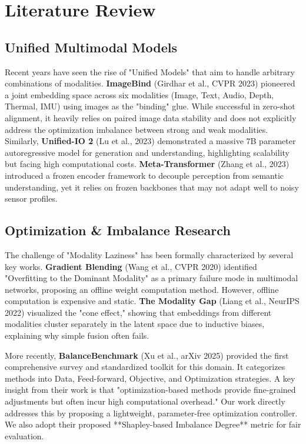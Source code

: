\documentclass[11pt, a4paper]{article}
\begin{document}
\section{Literature Review}
\subsection{Unified Multimodal Models}
Recent years have seen the rise of "Unified Models" that aim to handle arbitrary combinations of modalities. \textbf{ImageBind} (Girdhar et al., CVPR 2023) pioneered a joint embedding space across six modalities (Image, Text, Audio, Depth, Thermal, IMU) using images as the "binding" glue. While successful in zero-shot alignment, it heavily relies on paired image data stability and does not explicitly address the optimization imbalance between strong and weak modalities. Similarly, \textbf{Unified-IO 2} (Lu et al., 2023) demonstrated a massive 7B parameter autoregressive model for generation and understanding, highlighting scalability but facing high computational costs. \textbf{Meta-Transformer} (Zhang et al., 2023) introduced a frozen encoder framework to decouple perception from semantic understanding, yet it relies on frozen backbones that may not adapt well to noisy sensor profiles.

\subsection{Optimization \& Imbalance Research}
The challenge of "Modality Laziness" has been formally characterized by several key works. \textbf{Gradient Blending} (Wang et al., CVPR 2020) identified "Overfitting to the Dominant Modality" as a primary failure mode in multimodal networks, proposing an offline weight computation method. However, offline computation is expensive and static. \textbf{The Modality Gap} (Liang et al., NeurIPS 2022) visualized the "cone effect," showing that embeddings from different modalities cluster separately in the latent space due to inductive biases, explaining why simple fusion often fails.

More recently, \textbf{BalanceBenchmark} (Xu et al., arXiv 2025) provided the first comprehensive survey and standardized toolkit for this domain. It categorizes methods into Data, Feed-forward, Objective, and Optimization strategies. A key insight from their work is that "optimization-based methods provide fine-grained adjustments but often incur high computational overhead." Our work directly addresses this by proposing a lightweight, parameter-free optimization controller. We also adopt their proposed **Shapley-based Imbalance Degree** metric for fair evaluation.
\end{document}
